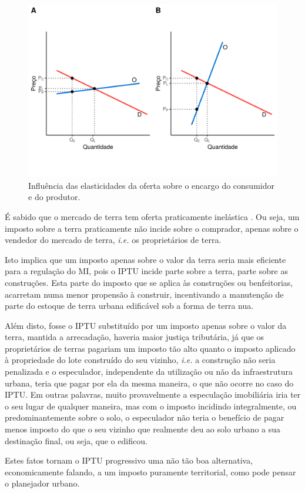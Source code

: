 \documentclass[
	12pt,				%
	oneside,			%
	a4paper,			%
	chapter=TITLE,		%
	section=TITLE,		%
	english,			%
	brazil				%
	]{abntex2}
\begin{document}
\begin{refsection}
\begin{figure}[H]
{\centering \includegraphics[width=0.7\linewidth]{images/deadweightElasticities-1} 

}

\caption{Influência das elasticidades da oferta sobre o encargo do consumidor e do produtor.}\label{fig:deadweightElasticities}
\end{figure}
É sabido que o mercado de terra tem oferta praticamente inelástica \autocite[
p.~2]{landtheory}. Ou seja, um imposto sobre a terra praticamente não incide sobre o
comprador, apenas sobre o vendedor do mercado de terra, \emph{i.e.} os proprietários
de terra.

Isto implica que um imposto apenas sobre o valor da terra seria mais eficiente
para a regulação do \gls{MI}, pois o \gls{IPTU} incide parte sobre a terra,
parte sobre as construções. Esta parte do imposto que se aplica às construções
ou benfeitorias, acarretam numa menor propensão à construir, incentivando a
manutenção de parte do estoque de terra urbana edificável sob a forma de terra
nua.

Além disto, fosse o \gls{IPTU} substituído por um imposto apenas sobre o valor
da terra, mantida a arrecadação, haveria maior justiça tributária, já que os
proprietários de terras pagariam um imposto tão alto quanto o imposto aplicado à
propriedade do lote construído do seu vizinho, \emph{i.e.} a construção não seria
penalizada e o especulador, independente da utilização ou não da infraestrutura
urbana, teria que pagar por ela da mesma maneira, o que não ocorre no caso do
\gls{IPTU}. Em outras palavras, muito provavelmente a especulação imobiliária
iria ter o seu lugar de qualquer maneira, mas com o imposto incidindo
integralmente, ou predominantemente sobre o solo, o especulador não teria o
benefício de pagar menos imposto do que o seu vizinho que realmente deu ao solo
urbano a sua destinação final, ou seja, que o edificou.

Estes fatos tornam o \gls{IPTU} progressivo uma não tão boa alternativa,
economicamente falando, a um imposto puramente territorial, como pode pensar o
planejador urbano.


\end{refsection}
\end{document}
